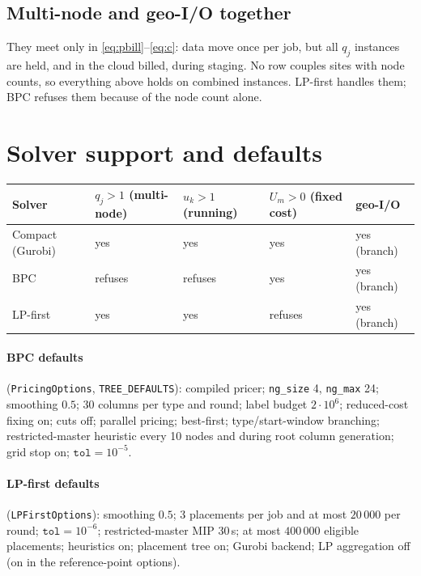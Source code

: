 \documentclass[11pt,a4paper]{article}
\theoremstyle{definition}
\theoremstyle{remark}
\newcommand{\code}[1]{\texttt{#1}}
\begin{document}
\subsection{Multi-node and geo-I/O together}
They meet only in \eqref{eq:pbill}--\eqref{eq:c}: data move once per job, but
all $q_j$ instances are held, and in the cloud billed, during staging. No row
couples sites with node counts, so everything above holds on combined
instances. LP-first handles them; BPC refuses them because of the node count
alone.

\section{Solver support and defaults}\label{sec:support}

\begin{center}
\small
\renewcommand{\arraystretch}{1.15}
\begin{tabular}{@{}p{3.0cm}p{2.6cm}p{2.6cm}p{2.6cm}p{2.0cm}@{}}
\toprule
Solver & $q_j>1$ (multi-node) & $u_k>1$ (running) & $U_m>0$ (fixed cost) & geo-I/O \\
\midrule
Compact (Gurobi) & yes & yes & yes & yes (branch) \\
BPC & refuses & refuses & yes & yes (branch) \\
LP-first & yes & yes & refuses & yes (branch) \\
\bottomrule
\end{tabular}
\end{center}

\paragraph{BPC defaults} (\code{PricingOptions}, \code{TREE\_DEFAULTS}):
compiled pricer; \code{ng\_size} 4, \code{ng\_max} 24; smoothing $0.5$;
30 columns per type and round; label budget $2\cdot10^6$; reduced-cost fixing
on; cuts off; parallel pricing; best-first; type/start-window branching;
restricted-master heuristic every 10 nodes and during root column generation;
grid stop on; $\texttt{tol}=10^{-5}$.

\paragraph{LP-first defaults} (\code{LPFirstOptions}): smoothing $0.5$;
3 placements per job and at most $20\,000$ per round; $\texttt{tol}=10^{-6}$;
restricted-master MIP 30\,s; at most $400\,000$ eligible placements; heuristics
on; placement tree on; Gurobi backend; LP aggregation off (on in the
reference-point options).
\end{document}
